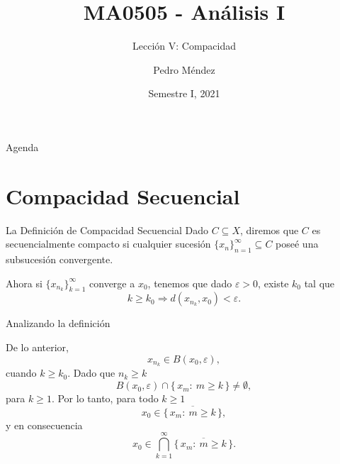 \documentclass[utf8]{beamer}
\title[MA0505]{MA0505 - An\'alisis I}
\subtitle{Lecci\'on V: Compacidad}
\author{Pedro M\'endez\inst{1}}
\institute[Universidad de Costa Rica] %
{
  \inst{1}%
  Departmento de Matem\'atica Pura y Ciencias Actuariales\\
  Universidad de Costa Rica
  }
\date[I-2021] {Semestre I, 2021}
\theoremstyle{plain}
\theoremstyle{definition}
\theoremstyle{remark}
\numberwithin{equation}{section}
\newcommand{\eps}{\varepsilon}          %
\newcommand{\set}[1]{\{\,#1\,\}}    %
\renewcommand{\geq}{\geqslant}          %
\newcommand{\To}{\Rightarrow}
\newcommand{\ov}{\overline}
\begin{document}
\begin{frame}
  \titlepage
\end{frame}

\begin{frame}{Agenda}
  \tableofcontents
\end{frame}





\section{Compacidad Secuencial}

\begin{frame}{La Definición de Compacidad Secuencial}%
   Dado $C\subseteq X$, diremos que $C$ es \alert{secuencialmente compacto}\label{def:compacidadSecuencial} si cualquier 
   sucesi\'on $\{x_n\}_{n=1}^\infty\subseteq C$ pose\'e una subsucesi\'on convergente.\vspace{1cm}
   
  
  Ahora si $\{x_{n_k}\}_{k=1}^\infty$ converge a $x_0$, tenemos que dado $\eps>0$, existe $k_0$ tal que 
   $$k\geq k_0\To d(x_{n_k},x_0)<\eps.$$
  
\end{frame}

\begin{frame}{Analizando la definici\'on}

  De lo anterior, 
  $$x_{n_k}\in B(x_0,\eps),$$ 
  cuando $k\geq k_0$. Dado que $n_k \geq k$ 
  $$B(x_0,\eps)\cap\set{x_m:\ m\geq k}\neq \emptyset,$$
  para $k\geq 1$.
  Por lo tanto, para todo  $k\geq 1$
  $$x_0\in \ov{\set{x_m:\ m\geq k}},$$   y en consecuencia 
  $$x_0\in \bigcap_{k=1}^\infty\ov{\set{x_m:\ m\geq k}}.$$

\end{frame}
\end{document}
